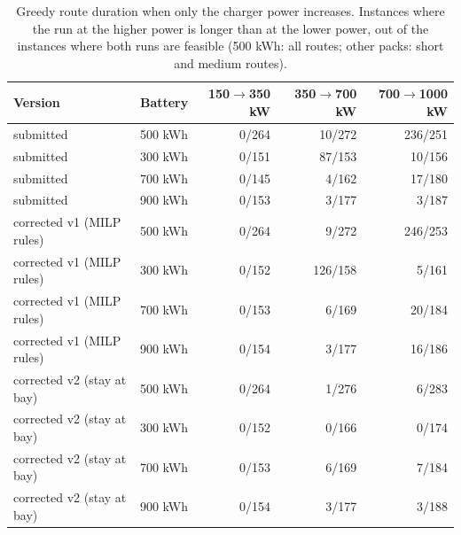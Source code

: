 \begin{table}[htbp]
\centering
\caption{Greedy route duration when only the charger power increases. Instances where the run at the higher power is longer than at the lower power, out of the instances where both runs are feasible (500 kWh: all routes; other packs: short and medium routes).}
\label{tab:greedy-monotonicity}
\begin{tabular}{ll rrr}
\toprule
Version & Battery & 150$\to$350 kW & 350$\to$700 kW & 700$\to$1000 kW \\
\midrule
submitted & 500 kWh & 0/264 & 10/272 & 236/251 \\
submitted & 300 kWh & 0/151 & 87/153 & 10/156 \\
submitted & 700 kWh & 0/145 & 4/162 & 17/180 \\
submitted & 900 kWh & 0/153 & 3/177 & 3/187 \\
\midrule
corrected v1 (MILP rules) & 500 kWh & 0/264 & 9/272 & 246/253 \\
corrected v1 (MILP rules) & 300 kWh & 0/152 & 126/158 & 5/161 \\
corrected v1 (MILP rules) & 700 kWh & 0/153 & 6/169 & 20/184 \\
corrected v1 (MILP rules) & 900 kWh & 0/154 & 3/177 & 16/186 \\
\midrule
corrected v2 (stay at bay) & 500 kWh & 0/264 & 1/276 & 6/283 \\
corrected v2 (stay at bay) & 300 kWh & 0/152 & 0/166 & 0/174 \\
corrected v2 (stay at bay) & 700 kWh & 0/153 & 6/169 & 7/184 \\
corrected v2 (stay at bay) & 900 kWh & 0/154 & 3/177 & 3/188 \\
\bottomrule
\end{tabular}
\end{table}
